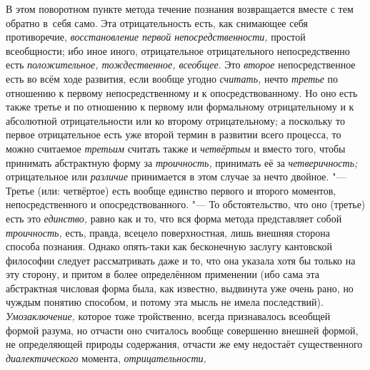 В этом поворотном пункте метода течение познания возвращается
вместе с тем обратно в~себя само. Эта отрицательность есть, как снимающее
себя противоречие, {\em восстановление
первой непосредственности,} простой всеобщности; ибо иное
иного, отрицательное отрицательного непосредственно есть
{\em положительное, тождественное, всеобщее}. Это {\em второе}
непосредственное есть во всём ходе развития, если вообще угодно {\em считать,}
нечто {\em третье} по отношению к первому непосредственному и к
опосредствованному. Но оно есть также третье и по отношению к первому или
формальному отрицательному и к абсолютной отрицательности или ко второму
отрицательному; а поскольку то первое отрицательное есть уже второй термин
в развитии всего процесса, то можно считаемое {\em третьим} считать
также и {\em четвёртым} и вместо того, чтобы принимать абстрактную форму за
{\em троичность,} принимать её за {\em четверичность;} отрицательное или
{\em различие} принимается в этом случае за нечто двойное. "---
Третье (или: четвёртое) есть вообще единство первого и
второго моментов, непосредственного и опосредствованного. "---
То обстоятельство, что оно (третье) есть это {\em единство,} равно как
и то, что вся форма метода представляет собой {\em троичность,} есть,
правда, всецело поверхностная, лишь внешняя сторона способа познания.
Однако опять-таки как бесконечную заслугу кантовской
философии
следует рассматривать даже и то, что она указала хотя бы
только на эту сторону, и притом в более определённом применении (ибо сама
эта абстрактная числовая форма была, как известно, выдвинута уже очень
рано, но чуждым понятию способом, и потому эта мысль не имела последствий).
{\em Умозаключение,} которое тоже тройственно, всегда признавалось всеобщей
формой разума, но отчасти оно считалось вообще совершенно внешней формой, не
определяющей природы содержания, отчасти же ему недостаёт существенного
{\em диалектического} момента, {\em отрицательности,}
